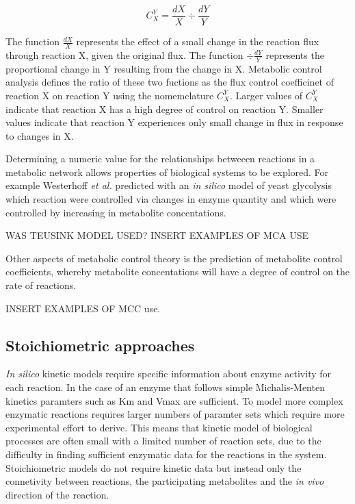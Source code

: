 \begin{equation}\label{fcc}
C_{X}^{Y} = \frac{dX}{X}\div\frac{dY}{Y}
\end{equation}

The function $\frac{dX}{X}$ represents the effect of a small change in the reaction flux through reaction X, given the original flux. The function $\div\frac{dY}{Y}$ represents the proportional change in Y resulting from the change in X. Metabolic control analysis defines the ratio of these two fuctions as the flux control coefficinet of reaction X on reaction Y using the nomemclature $C_{X}^{Y}$. Larger values of $C_{X}^{Y}$ indicate that reaction X has a high degree of control on reaction Y. Smaller values indicate that reaction Y experiences only small change in flux in response to changes in X.

Determining a numeric value for the relationships betweeen reactions in a metabolic network allows properties of biological systems to be explored. For example Westerhoff \emph{et al.} \cite{hierarchical_control} predicted with an \emph{in silico} model of yeast glycolysis \cite{teusink} which reaction were controlled via changes in enzyme quantity and which were controlled by increasing in metabolite concentations.

WAS TEUSINK MODEL USED?
INSERT EXAMPLES OF MCA USE

Other aspects of metabolic control theory is the prediction of metabolite control coefficients, whereby metabolite concentations will have a degree of control on the rate of reactions.

INSERT EXAMPLES OF MCC use.

\subsection{Stoichiometric approaches}

\emph{In silico} kinetic models require specific information about enzyme activity for each reaction. In the case of an enzyme that follows simple Michalis-Menten kinetics paramters such as Km and Vmax are sufficient. To model more complex enzymatic reactions requires larger numbers of paramter sets which require more experimental effort to derive. This means that kinetic model of biological processes are often small with a limited number of reaction sets, due to the difficulty in finding sufficient enzymatic data for the reactions in the system. Stoichiometric models do not require kinetic data but instead only the connetivity between reactions, the participating metabolites and the \emph{in vivo} direction of the reaction.

